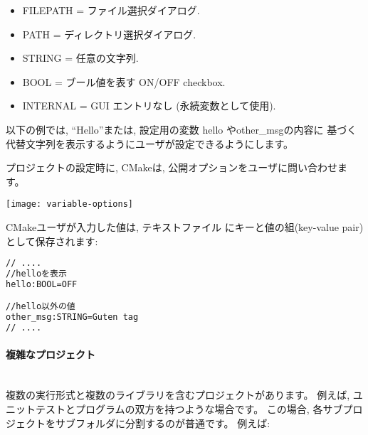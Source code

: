 \documentclass[11pt,a4paper,landscape]{ltjsarticle}
\newcommand{\sectiontitle}[1]{\paragraph{#1} \ \\} %
\begin{document}
\begin{multicols}{2}
\begin{itemize}  
\item FILEPATH = ファイル選択ダイアログ.
\item PATH     = ディレクトリ選択ダイアログ.
\item STRING   = 任意の文字列.
\item BOOL     = ブール値を表す ON/OFF checkbox.
\item INTERNAL = GUI エントリなし (永続変数として使用).
\end{itemize}

以下の例では, ``Hello''または, 設定用の変数 hello やother\_msgの内容に
基づく代替文字列を表示するようにユーザが設定できるようにします。


プロジェクトの設定時に, CMakeは, 公開オプションをユーザに問い合わせま
す。

\texttt{[image: variable-options]}

CMakeユーザが入力した値は, テキストファイル 
にキーと値の組(key-value pair)として保存されます:
\begin{lstlisting}[language=bash]
// ....
//helloを表示
hello:BOOL=OFF

//hello以外の値
other_msg:STRING=Guten tag
// ....
\end{lstlisting}

\sectiontitle{複雑なプロジェクト}

複数の実行形式と複数のライブラリを含むプロジェクトがあります。
例えば, ユニットテストとプログラムの双方を持つような場合です。
この場合, 各サブプロジェクトをサブフォルダに分割するのが普通です。
例えば: 
\vspace{\baselineskip} %
\noindent{}


\end{multicols}
\end{document}
